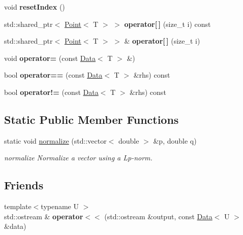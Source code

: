\begin{DoxyCompactItemize}
\mbox{\label{class_data_aae060f1a0ce3448b8e9b9f63d9ee4bbc}} 
void {\bfseries reset\+Index} ()
\item 
\mbox{\label{class_data_a17808dfc737024d7765f88bd6fa2c67a}} 
std\+::shared\+\_\+ptr$<$ \mbox{\hyperlink{class_point}{Point}}$<$ T $>$ $>$ {\bfseries operator\mbox{[}$\,$\mbox{]}} (size\+\_\+t i) const
\item 
\mbox{\label{class_data_ad2271c70b41bd9bab92a5f342fb1ea38}} 
std\+::shared\+\_\+ptr$<$ \mbox{\hyperlink{class_point}{Point}}$<$ T $>$ $>$ \& {\bfseries operator\mbox{[}$\,$\mbox{]}} (size\+\_\+t i)
\item 
\mbox{\label{class_data_a108d2986a26cfe07f7a4ee5a2e8e1c9b}} 
void {\bfseries operator=} (const \mbox{\hyperlink{class_data}{Data}}$<$ T $>$ \&)
\item 
\mbox{\label{class_data_a67b4eb14ee534c26b115e35ac9537baa}} 
bool {\bfseries operator==} (const \mbox{\hyperlink{class_data}{Data}}$<$ T $>$ \&rhs) const
\item 
\mbox{\label{class_data_a36bc3fedaadbe06283b6796018381e2c}} 
bool {\bfseries operator!=} (const \mbox{\hyperlink{class_data}{Data}}$<$ T $>$ \&rhs) const
\end{DoxyCompactItemize}
\subsection*{Static Public Member Functions}
\begin{DoxyCompactItemize}
\item 
static void \mbox{\hyperlink{class_data_ad5c41d33e1de7531b952d6f33b7eca90}{normalize}} (std\+::vector$<$ double $>$ \&p, double q)
\begin{DoxyCompactList}\small\item\em normalize Normalize a vector using a Lp-\/norm. \end{DoxyCompactList}\end{DoxyCompactItemize}
\subsection*{Friends}
\begin{DoxyCompactItemize}
\item 
\mbox{\label{class_data_a6e0fbda87f04e3f9960f8f2a818e2f9d}} 
{\footnotesize template$<$typename U $>$ }\\std\+::ostream \& {\bfseries operator$<$$<$} (std\+::ostream \&output, const \mbox{\hyperlink{class_data}{Data}}$<$ U $>$ \&data)
\end{DoxyCompactItemize}


